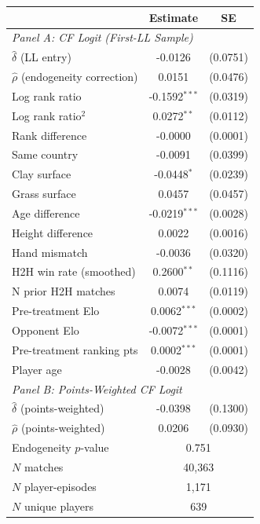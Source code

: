 \begin{tabular}{lcc}
\toprule
 & Estimate & SE \\
\midrule
\multicolumn{3}{l}{\textit{Panel A: CF Logit (First-LL Sample)}} \\[3pt]
$\hat{\delta}$ (LL entry) & -0.0126 & (0.0751) \\
$\hat{\rho}$ (endogeneity correction) & 0.0151 & (0.0476) \\
Log rank ratio & -0.1592$^{***}$ & (0.0319) \\
Log rank ratio$^2$ & 0.0272$^{**}$ & (0.0112) \\
Rank difference & -0.0000 & (0.0001) \\
Same country & -0.0091 & (0.0399) \\
Clay surface & -0.0448$^{*}$ & (0.0239) \\
Grass surface & 0.0457 & (0.0457) \\
Age difference & -0.0219$^{***}$ & (0.0028) \\
Height difference & 0.0022 & (0.0016) \\
Hand mismatch & -0.0036 & (0.0320) \\
H2H win rate (smoothed) & 0.2600$^{**}$ & (0.1116) \\
N prior H2H matches & 0.0074 & (0.0119) \\
Pre-treatment Elo & 0.0062$^{***}$ & (0.0002) \\
Opponent Elo & -0.0072$^{***}$ & (0.0001) \\
Pre-treatment ranking pts & 0.0002$^{***}$ & (0.0001) \\
Player age & -0.0028 & (0.0042) \\
\midrule
\multicolumn{3}{l}{\textit{Panel B: Points-Weighted CF Logit}} \\[3pt]
$\hat{\delta}$ (points-weighted) & -0.0398 & (0.1300) \\
$\hat{\rho}$ (points-weighted) & 0.0206 & (0.0930) \\
\midrule
Endogeneity $p$-value & \multicolumn{2}{c}{0.751} \\
$N$ matches & \multicolumn{2}{c}{40,363} \\
$N$ player-episodes & \multicolumn{2}{c}{1,171} \\
$N$ unique players & \multicolumn{2}{c}{639} \\
\bottomrule
\end{tabular}
